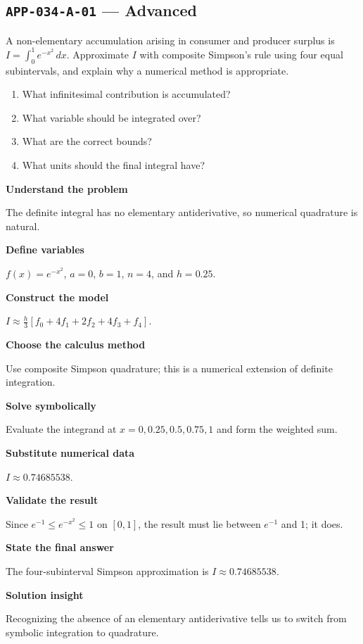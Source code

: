 \documentclass[11pt]{book}
\newcommand{\pid}[1]{\texttt{#1}}
\begin{document}
\subsection*{\pid{APP-034-A-01} — Advanced}
\begin{problembox}
A non-elementary accumulation arising in consumer and producer surplus is $I=\int_0^1 e^{-x^2}\,dx$. Approximate $I$ with composite Simpson's rule using four equal subintervals, and explain why a numerical method is appropriate.
\end{problembox}
\begin{promptbox}\begin{enumerate}
\item What infinitesimal contribution is accumulated?
\item What variable should be integrated over?
\item What are the correct bounds?
\item What units should the final integral have?
\end{enumerate}\end{promptbox}
\begin{solutionbox}
\textbf{Understand the problem}\par The definite integral has no elementary antiderivative, so numerical quadrature is natural.\par\medskip
\textbf{Define variables}\par $f(x)=e^{-x^2}$, $a=0$, $b=1$, $n=4$, and $h=0.25$.\par\medskip
\textbf{Construct the model}\par $I\approx\frac{h}{3}[f_0+4f_1+2f_2+4f_3+f_4]$.\par\medskip
\textbf{Choose the calculus method}\par Use composite Simpson quadrature; this is a numerical extension of definite integration.\par\medskip
\textbf{Solve symbolically}\par Evaluate the integrand at $x=0,0.25,0.5,0.75,1$ and form the weighted sum.\par\medskip
\textbf{Substitute numerical data}\par $I\approx 0.74685538$.\par\medskip
\textbf{Validate the result}\par Since $e^{-1}\le e^{-x^2}\le1$ on $[0,1]$, the result must lie between $e^{-1}$ and 1; it does.\par\medskip
\textbf{State the final answer}\par The four-subinterval Simpson approximation is $I\approx 0.74685538$.\par\medskip
\textbf{Solution insight}\par Recognizing the absence of an elementary antiderivative tells us to switch from symbolic integration to quadrature.\par\medskip
\end{solutionbox}
\end{document}
